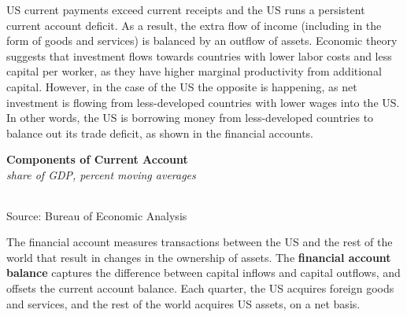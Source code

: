 \documentclass{report}
\begin{document}
{\begin{minipage}{0.76\textwidth}
\small US current payments exceed current receipts and the US runs a persistent current account deficit. As a result, the extra flow of income (including in the form of goods and services) is balanced by an outflow of assets. Economic theory suggests that investment flows towards countries with lower labor costs and less capital per worker, as they have higher marginal productivity from additional capital. However, in the case of the US the opposite is happening, as net investment is flowing from less-developed countries with lower wages into the US. In other words, the US is borrowing money from less-developed countries to balance out its trade deficit, as shown in the financial accounts. 
\end{minipage}
\newpage
\begin{minipage}{0.76\textwidth}
\normalsize \textbf{Components of Current Account}\\
\footnotesize{\textit{share of GDP, percent \hspace{70mm} moving averages}}\\ 
 \setlength{\tabcolsep}{3.1pt} \color{black!90}
	{\renewcommand{\arraystretch}{1.48}
		\begin{tabular}{p{32mm} R{8mm} R{8mm} R{8mm} R{8mm} R{8mm} 
		   R{8mm} R{9.4mm} R{8.4mm} }
			  \hline
		\end{tabular}}
		
\footnotesize{Source: Bureau of Economic Analysis}
\vspace{4mm}

\small The financial account measures transactions between the US and the rest of the world that result in changes in the ownership of assets. The \textbf{financial account balance} captures the difference between capital inflows and capital outflows, and offsets the current account balance. Each quarter, the US acquires foreign goods and services, and the rest of the world acquires US assets, on a net basis. 

 
\vspace{1mm}


\end{minipage}}
\end{document}
